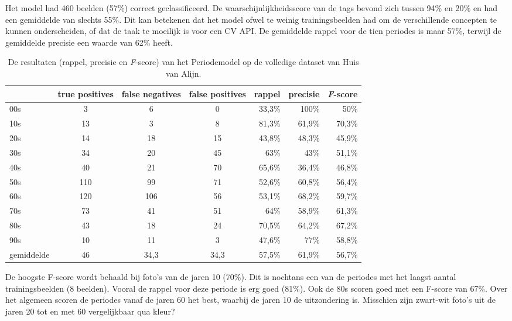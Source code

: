 Het model had 460 beelden (57\%) correct geclassificeerd. De waarschijnlijkheidsscore van de tags bevond zich tussen 94\% en 20\% en had een gemiddelde van slechts 55\%. Dit kan betekenen dat het model ofwel te weinig trainingsbeelden had om de verschillende concepten te kunnen onderscheiden, of dat de taak te moeilijk is voor een CV API. De gemiddelde rappel voor de tien periodes is maar 57\%, terwijl de gemiddelde precisie een waarde van 62\% heeft.

\begin{table}
    \begin{tabular}{l|ccc|rrr}
        \toprule
        & true positives  & false negatives & false positives & rappel & precisie & \textit{F}-score \\ 
        \midrule
        00s & 3 & 6 & 0 & 33,3\% & 100\% & 50\% \\ 
        10s & 13 & 3 & 8 &  81,3\% & 61,9\% & 70,3\% \\ 
        20s & 14 & 18 & 15 & 43,8\% & 48,3\% & 45,9\% \\ 
        30s & 34 & 20 & 45  & 63\% & 43\% & 51,1\% \\ 
        40s & 40 & 21 & 70  & 65,6\% & 36,4\% & 46,8\% \\ 
        50s & 110 & 99 & 71  & 52,6\% & 60,8\% & 56,4\% \\ 
        60s & 120 & 106 & 56  & 53,1\% & 68,2\% & 59,7\% \\ 
        70s & 73 & 41 & 51  & 64\% & 58,9\% & 61,3\% \\ 
        80s & 43 & 18 & 24  & 70,5\% & 64,2\% & 67,2\% \\ 
        90s & 10 & 11 & 3  & 47,6\% & 77\% & 58,8\% \\ 
        \midrule
        gemiddelde & 46 & 34,3 & 34,3  & 57,5\% & 61,9\% & 56,7\% \\ 
        \bottomrule
    \end{tabular} 
    \caption{De resultaten (rappel, precisie en \textit{F}-score) van het Periodemodel op de volledige dataset van Huis van Alijn.}
    \label{tab:resultaten-periodemodel}
\end{table}

De hoogste F-score wordt behaald bij foto’s van de jaren 10 (70\%). Dit is nochtans een van de periodes met het laagst aantal trainingsbeelden (8 beelden). Vooral de rappel voor deze periode is erg goed (81\%). Ook de 80s scoren goed met een F-score van 67\%. Over het algemeen scoren de periodes vanaf de jaren 60 het best, waarbij de jaren 10 de uitzondering is. Misschien zijn zwart-wit foto’s uit de jaren 20 tot en met 60 vergelijkbaar qua kleur?

